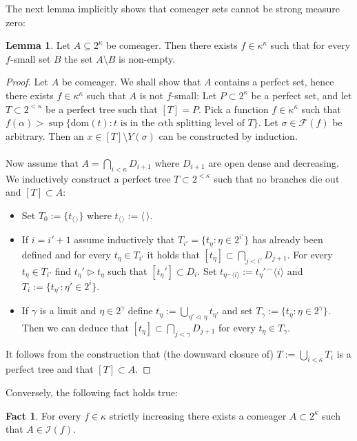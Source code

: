 \documentclass[12pt,a4paper]{scrartcl}
\theoremstyle{definition}
\newtheorem{fact}[definition]{Fact}
\newtheorem{lemma}[definition]{Lemma}
\numberwithin{equation}{section}
\begin{document}
The next lemma implicitly shows that comeager sets cannot be strong measure zero:

\begin{lemma} \label{L1}
Let $A \subseteq 2^\kappa$ be comeager. Then there exists $f \in \kappa^\kappa$ such that for every $f$-small set $B$ the set $A\setminus  B $ is non-empty.
\end{lemma}

\begin{proof}
Let $A$ be comeager. We shall show that $A$ contains a perfect set, hence there exists $f \in \kappa^\kappa$ such that $A$ is not $f$-small: Let $P \subset 2^\kappa$ be a perfect set, and let $T \subset 2^{< \kappa}$ be a perfect tree such that $[T]=P$. Pick a function $f \in \kappa^\kappa$ such that $f(\alpha) > \sup \{ \text{dom}(t) \colon t \,\, \text{is in the}\,\, \alpha \text{th} \,\, \text{splitting level of} \,\,T\}$. Let $\sigma \in \mathcal{F}(f)$ be arbitrary. Then an $x \in [T] \setminus Y(\sigma)$ can be constructed by induction.\\
\\
Now assume that $A= \bigcap_{i<\kappa}D_{i+1}$ where $D_{i+1}$ are open dense and decreasing. We inductively construct a perfect tree $T \subset 2^{<\kappa}$ such that no branches die out and $[T] \subset A$:
\begin{itemize}
\item Set $T_0:=\{t_{\langle \, \rangle}\}$ where $t_{\langle \, \rangle}:= \langle \,\rangle$.
\item If $i=i'+1$ assume inductively that $T_{i'}=\{t_\eta \colon \eta \in 2^{i'}\}$ has already been defined and for every $t_\eta \in T_{i'}$ it holds that $[t_\eta] \subset \bigcap_{j < i'} D_{j+1}$. For every $t_\eta \in T_{i'}$ find $t_\eta' \triangleright t_\eta$ such that $[t_\eta'] \subset D_i$. Set $t_{\eta^\frown \langle i \rangle}:=t_\eta'^\frown \langle i \rangle$ and $T_i:=\{t_{\eta'} \colon \eta' \in 2^i\}$.
\item If $\gamma$ is a limit and $\eta \in 2^\gamma$ define $t_\eta:= \bigcup_{\eta' \triangleleft \, \eta} t_{\eta'}$ and set $T_\gamma:=\{t_\eta \colon \eta \in 2^\gamma\}$. Then we can deduce that $[t_\eta] \subset \bigcap_{j< \gamma} D_{j+1}$ for every $t_\eta \in T_\gamma$.
\end{itemize}
It follows from the construction that (the downward closure of) $T:= \bigcup_{i < \kappa} T_i$ is a perfect tree and that $[T] \subset A$.
\end{proof}

Conversely, the following fact holds true:
\begin{fact}
For every $f \in \kappa$ strictly increasing there exists a comeager $A \subset 2^\kappa$ such that $A \in \mathcal{I}(f)$.

\end{fact}
\end{document}
